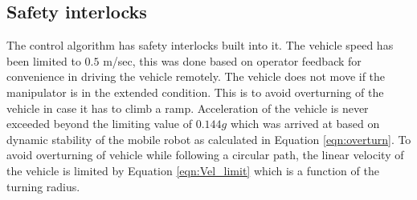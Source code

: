  
\subsection{Safety interlocks}
The control algorithm has safety interlocks built into it. The vehicle speed has been limited to $0.5$ m/sec, this was done based on operator feedback for convenience in driving the vehicle remotely. The vehicle does not move if the manipulator is in the extended condition. This is to avoid overturning of the vehicle in case it has to climb a ramp. Acceleration of the vehicle is never exceeded beyond the limiting value of  $0.144g$ which was arrived at  based on dynamic stability of the mobile robot as calculated in Equation \ref{eqn:overturn}. To avoid overturning of vehicle while following a circular path, the linear velocity of the vehicle is limited by Equation \ref{eqn:Vel_limit} which is a function of the turning radius.
